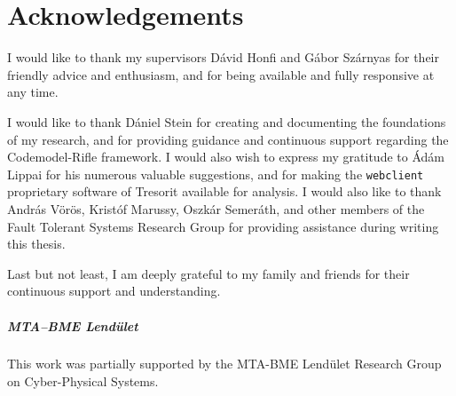 \chapter*{Acknowledgements}
{}
\thispagestyle{plain}

I would like to thank my supervisors Dávid Honfi and Gábor Szárnyas for their friendly advice and enthusiasm, and for being available and fully responsive at any time.

I would like to thank Dániel Stein for creating and documenting the foundations of my research, and for providing guidance and continuous support regarding the Codemodel-Rifle framework. I would also wish to express my gratitude to Ádám Lippai for his numerous valuable suggestions, and for making the \lstinline{webclient} proprietary software of Tresorit available for analysis. I would also like to thank András Vörös, Kristóf Marussy, Oszkár Semeráth, and other members of the Fault Tolerant Systems Research Group for providing assistance during writing this thesis.

Last but not least, I am deeply grateful to my family and friends for their continuous support and understanding.

\vfill
\paragraph{MTA–BME Lendület}
This work was partially supported by the MTA-BME Lendület Research Group on Cyber-Physical Systems.


